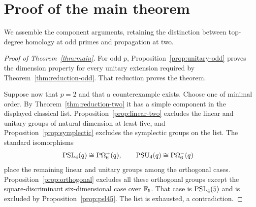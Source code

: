 \section{Proof of the main theorem}\label{sec:conclusion}

We assemble the component arguments, retaining the distinction between
top-degree homology at odd primes and propagation at two.

\begin{proof}[Proof of Theorem~\ref{thm:main}]
For odd $p$, Proposition~\ref{prop:unitary-odd} proves the dimension
property for every unitary extension required by
Theorem~\ref{thm:reduction-odd}. That reduction proves the theorem.

Suppose now that $p=2$ and that a counterexample exists. Choose one of
minimal order. By Theorem~\ref{thm:reduction-two} it has a simple
component in the displayed classical list.
Proposition~\ref{prop:linear-two} excludes the linear and unitary
groups of natural dimension at least five, and
Proposition~\ref{prop:symplectic} excludes the symplectic groups on
the list. The standard isomorphisms
\[
\operatorname{PSL}_4(q)\cong\mathrm P\Omega_6^+(q),
\qquad
\operatorname{PSU}_4(q)\cong\mathrm P\Omega_6^-(q)
\]
place the remaining linear and unitary groups among the orthogonal
cases. Proposition~\ref{prop:orthogonal} excludes all these
orthogonal groups except the square-discriminant six-dimensional
case over $\mathbb F_5$. That case is $\operatorname{PSL}_4(5)$ and is excluded by
Proposition~\ref{prop:psl45}. The list is exhausted, a contradiction.
\end{proof}

